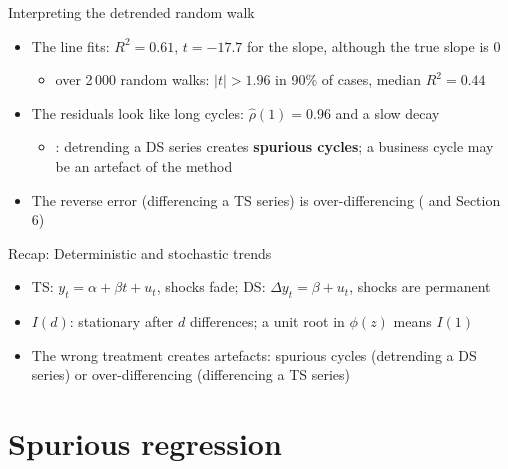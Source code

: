 \begin{frame}{Interpreting the detrended random walk}
\itemsize{\small}
\begin{itemize}
    \item The line fits: $R^2 = 0.61$, $t = \ensuremath{-}17.7$ for the slope, although the true slope is 0
    \begin{itemize}
        \item over 2\,000 random walks: $|t| > 1.96$ in 90\% of cases, median $R^2 = 0.44$
    \end{itemize}
    \item The residuals look like long cycles: $\hat\rho(1) = 0.96$ and a slow decay
    \begin{itemize}
        \item {}: detrending a DS series creates \textbf{spurious cycles}; a business cycle may be an artefact of the method
    \end{itemize}
    \item The reverse error (differencing a TS series) is over-differencing ( and Section 6)
\end{itemize}
\end{frame}

\begin{frame}{Recap: Deterministic and stochastic trends}
\itemsize{\small}
\begin{itemize}
    \item TS: $y_t = \alpha + \beta t + u_t$, shocks fade; DS: $\Delta y_t = \beta + u_t$, shocks are permanent
    \item $I(d)$: stationary after $d$ differences; a unit root in $\phi(z)$ means $I(1)$
    \item The wrong treatment creates artefacts: spurious cycles (detrending a DS series) or over-differencing (differencing a TS series)
\end{itemize}
\end{frame}


\section{Spurious regression}

